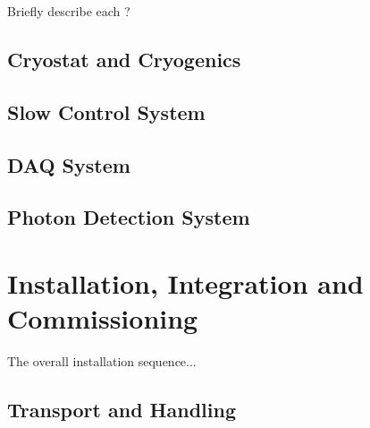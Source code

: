 Briefly describe each ?



\subsection{Cryostat and Cryogenics}
\label{sec:fddp-tpc-elec-intfc-cryo}

\subsection{Slow Control System}
\label{sec:fddp-tpc-elec-intfc-sc}

\subsection{DAQ System}
\label{sec:fddp-tpc-elec-intfc-daq}

\subsection{Photon Detection System}
\label{sec:fddp-tpc-elec-intfc-pmt}




\section{Installation, Integration and Commissioning}
\label{sec:fddp-tpc-elec-install}

The overall installation sequence...

\subsection{Transport and Handling}
\label{sec:fddp-tpc-elec-install-transport}


